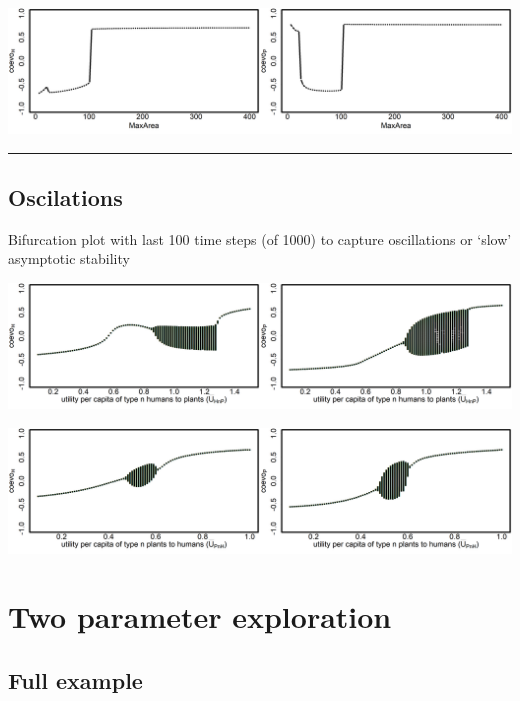 \documentclass[]{book}
\begin{document}
\includegraphics[width=1\linewidth]{plots/2_onePar-MaxArea_bifplot-pair}

\begin{center}\rule{0.5\linewidth}{\linethickness}\end{center}

\hypertarget{oscilations}{%
\section{Oscilations}\label{oscilations}}

Bifurcation plot with last 100 time steps (of 1000) to capture oscillations or `slow' asymptotic stability

\includegraphics[width=1\linewidth]{plots/2_onePar-mU.HnP.osc_bifplot-pair}

\includegraphics[width=1\linewidth]{plots/2_onePar-mU.PnH.osc_bifplot-pair}

\hypertarget{two-parameter-exploration}{%
\chapter{Two parameter exploration}\label{two-parameter-exploration}}

\newpage

\hypertarget{full-example}{%
\section{Full example}\label{full-example}}
\end{document}
